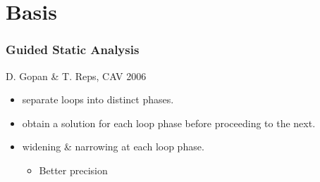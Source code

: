 \documentclass{beamer}
\begin{document}
\section[Basis]{Basis}

\begin{frame}
  \frametitle{Guided Static Analysis}

D. Gopan \& T. Reps, CAV 2006
\bigskip
\begin{itemize}
\item separate loops into distinct phases.
\item obtain a solution for each loop phase before proceeding to the next.
\item widening \& narrowing at each loop phase.
\begin{itemize}
\item Better precision
\end{itemize}
\end{itemize}
\end{frame}
\end{document}
